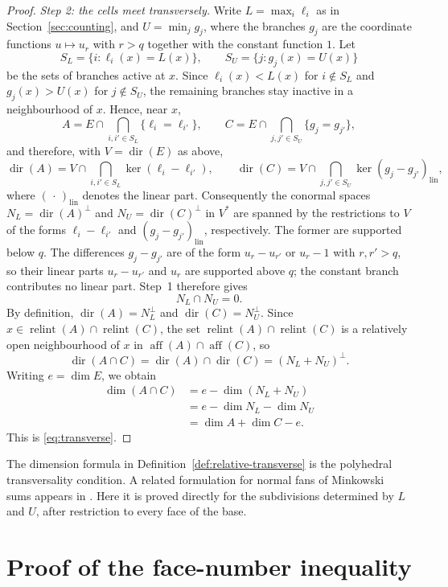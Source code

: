 \documentclass[a4paper,12pt]{amsart}
\theoremstyle{definition}
\theoremstyle{remark}
\newcommand{\relint}{\operatorname{relint}}
\newcommand{\dir}{\operatorname{dir}}
\begin{document}
\begin{proof}
\smallskip
\noindent\emph{Step 2: the cells meet transversely.}
Write $L=\max_i\ell_i$ as in Section~\ref{sec:counting}, and $U=\min_j g_j$, where the branches $g_j$ are the coordinate functions $u\mapsto u_r$ with $r>q$ together with the constant function $1$. 
Let 
\[
 S_L=\{i:\ell_i(x)=L(x)\},  \qquad  S_U=\{j:g_j(x)=U(x)\}
\]
be the sets of branches active at $x$. 
Since $\ell_i(x)<L(x)$ for $i\notin S_L$ and $g_j(x)>U(x)$ for $j\notin S_U$, the remaining branches stay inactive in a neighbourhood of $x$. 
Hence, near $x$,
\[
 A=E\cap\bigcap_{i,i'\in S_L}\{\ell_i=\ell_{i'}\},  \qquad  C=E\cap\bigcap_{j,j'\in S_U}\{g_j=g_{j'}\},
\]
and therefore, with $V=\dir(E)$ as above,
\[
 \dir(A)=V\cap\bigcap_{i,i'\in S_L}\ker(\ell_i-\ell_{i'}),  \qquad  \dir(C)=V\cap\bigcap_{j,j'\in S_U}\ker(g_j-g_{j'})_{\mathrm{lin}},
\]
where $(\,\cdot\,)_{\mathrm{lin}}$ denotes the linear part. 
Consequently the conormal spaces $N_L=\dir(A)^\perp$ and $N_U=\dir(C)^\perp$ in $V^*$ are spanned by the restrictions to $V$ of the forms $\ell_i-\ell_{i'}$ and $(g_j-g_{j'})_{\mathrm{lin}}$, respectively. 
The former are supported below $q$. 
The differences $g_j-g_{j'}$ are of the form $u_r-u_{r'}$ or $u_r-1$ with $r,r'>q$, so their linear parts $u_r-u_{r'}$ and $u_r$ are supported above $q$; the constant branch contributes no linear part. 
Step~1 therefore gives
\[
 N_L\cap N_U=0.
\]
By definition, $\dir(A)=N_L^\perp$ and $\dir(C)=N_U^\perp$. 
Since $x\in\relint(A)\cap\relint(C)$, the set $\relint(A)\cap\relint(C)$ is a relatively open neighbourhood of $x$ in $\operatorname{aff}(A)\cap\operatorname{aff}(C)$, so 
\[
 \dir(A\cap C)=\dir(A)\cap\dir(C)=(N_L+N_U)^\perp.
\]
Writing $e=\dim E$, we obtain
\begin{align*}
 \dim(A\cap C)  &=e-\dim(N_L+N_U)\\
 &=e-\dim N_L-\dim N_U\\
 &=\dim A+\dim C-e.
\end{align*}
This is \eqref{eq:transverse}.
\end{proof}

The dimension formula in Definition~\ref{def:relative-transverse} is the polyhedral transversality condition. 
A related formulation for normal fans of Minkowski sums appears in \cite[Sections~2--3]{FW10}. 
Here it is proved directly for the subdivisions determined by $L$ and $U$,  after restriction to every face of the base.

\section{Proof of the face-number inequality}\label{sec:dominance}
\end{document}
